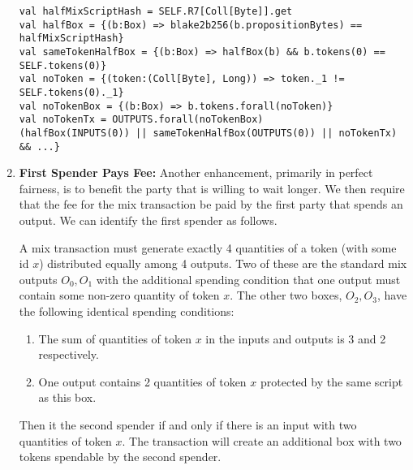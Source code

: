 \documentclass[11pt]{article}
\newcommand{\langname}{ErgoScript\xspace}
\begin{document}
\begin{enumerate}
\begin{verbatim}
val halfMixScriptHash = SELF.R7[Coll[Byte]].get
val halfBox = {(b:Box) => blake2b256(b.propositionBytes) == halfMixScriptHash}
val sameTokenHalfBox = {(b:Box) => halfBox(b) && b.tokens(0) == SELF.tokens(0)}
val noToken = {(token:(Coll[Byte], Long)) => token._1 != SELF.tokens(0)._1}
val noTokenBox = {(b:Box) => b.tokens.forall(noToken)}
val noTokenTx = OUTPUTS.forall(noTokenBox)
(halfBox(INPUTS(0)) || sameTokenHalfBox(OUTPUTS(0)) || noTokenTx) && ...} 
\end{verbatim}
\item \textbf{First Spender Pays Fee:} Another enhancement, primarily in perfect fairness, is to benefit the party that is willing to wait longer. We then require that the fee for the mix transaction be paid by the first party that spends an output. We can identify the first spender as follows. 

A mix transaction must generate exactly 4 quantities of a token (with some id $x$) distributed equally among 4 outputs. Two of these are the standard mix outputs $O_0, O_1$ with the additional spending condition that one output must contain some non-zero quantity of token $x$. The other two boxes, $O_2, O_3$, have the following identical spending conditions:
\begin{enumerate}
	\item The sum of quantities of token $x$ in the inputs and outputs is 3 and 2 respectively.
	\item One output contains 2 quantities of token $x$ protected by the same script as this box. 
\end{enumerate}

Then it the second spender if and only if there is an input with two quantities of token $x$. 
The transaction will create an additional box with two tokens spendable by the second spender.

\end{enumerate}





\end{document}
